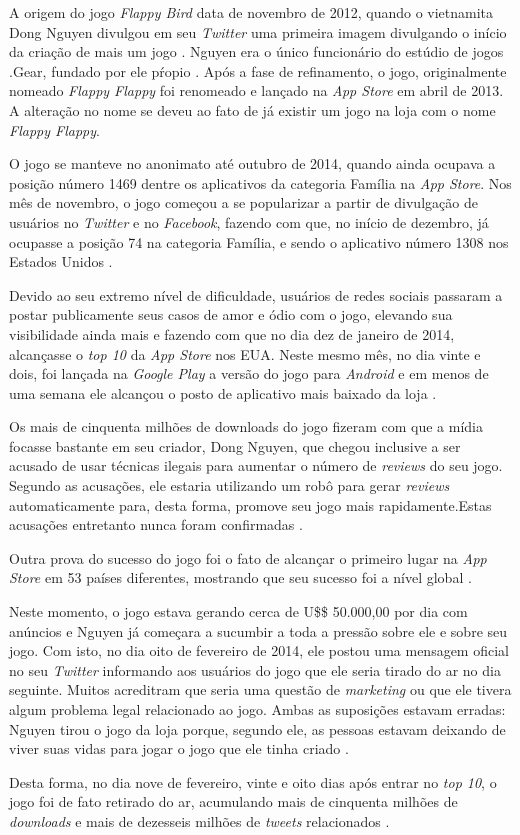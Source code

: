 A origem do jogo \textit{Flappy Bird} data de novembro de 2012, quando o vietnamita Dong Nguyen divulgou em seu \textit{Twitter} uma primeira imagem divulgando o início da criação de mais um jogo \cite{Warren2014}. Nguyen era o único funcionário do estúdio de jogos .Gear, fundado por ele pŕopio \cite{Harvar2014}. Após a fase de refinamento, o jogo, originalmente nomeado \textit{Flappy Flappy} foi renomeado e lançado na \textit{App Store} em abril de 2013. A alteração no nome se deveu ao fato de já existir um jogo na loja com o nome \textit{Flappy Flappy}.

O jogo se manteve no anonimato até outubro de 2014, quando ainda ocupava a posição número 1469 dentre os aplicativos da categoria Família na \textit{App Store}. Nos mês de novembro, o jogo começou a se popularizar a partir de divulgação de usuários no \textit{Twitter} e no \textit{Facebook}, fazendo com que, no início de dezembro, já ocupasse a posição 74 na categoria Família, e sendo o aplicativo número 1308 nos Estados Unidos \cite{Warren2014}.

Devido ao seu extremo nível de dificuldade, usuários de redes sociais passaram a postar publicamente seus casos de amor e ódio com o jogo, elevando sua visibilidade ainda mais e fazendo com que no dia dez de janeiro de 2014, alcançasse o \textit{top 10} da \textit{App Store} nos EUA. Neste mesmo mês, no dia vinte e dois, foi lançada na \textit{Google Play} a versão do jogo para \textit{Android} e em menos de uma semana ele alcançou o posto de aplicativo mais baixado da loja \cite{Warren2014}.

Os mais de cinquenta milhões de downloads do jogo fizeram com que a mídia focasse bastante em seu criador, Dong Nguyen, que chegou inclusive a ser acusado de usar técnicas ilegais para aumentar o número de \textit{reviews} do seu jogo. Segundo as acusações, ele estaria utilizando um robô para gerar \textit{reviews} automaticamente para, desta forma, promove seu jogo mais rapidamente.Estas acusações entretanto nunca foram confirmadas \cite{Warren2014}.

Outra prova do sucesso do jogo foi o fato de alcançar o primeiro lugar na \textit{App Store} em 53 países diferentes, mostrando que seu sucesso foi a nível global \cite{Warren2014}.

Neste momento, o jogo estava gerando cerca de U\$\$ 50.000,00 por dia com anúncios e Nguyen já começara a sucumbir a toda a pressão sobre ele e sobre seu jogo. Com isto, no dia oito de fevereiro de 2014, ele postou uma mensagem oficial no seu \textit{Twitter} informando aos usuários do jogo que ele seria tirado do ar no dia seguinte. Muitos acreditram que seria uma questão de \textit{marketing} ou que ele tivera algum problema legal relacionado ao jogo. Ambas as suposições estavam erradas: Nguyen tirou o jogo da loja porque, segundo ele, as pessoas estavam deixando de viver suas vidas para jogar o jogo que ele tinha criado \cite{Warren2014}.

Desta forma, no dia nove de fevereiro, vinte e oito dias após entrar no \textit{top 10}, o jogo foi de fato retirado do ar, acumulando mais de cinquenta milhões de \textit{downloads} e mais de dezesseis milhões de \textit{tweets} relacionados \cite{Warren2014}.


